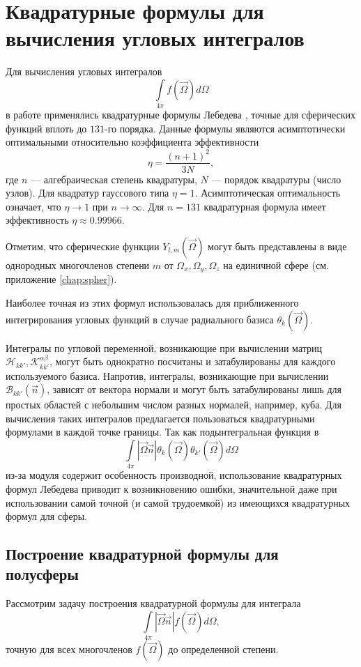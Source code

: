 \section{Квадратурные формулы для вычисления угловых интегралов}

Для вычисления угловых интегралов
\[
\int\limits_{4\pi} f(\vec \Omega) d\Omega 
\]
в работе применялись квадратурные формулы Лебедева \cite{lebedev1999}, точные для сферических функций вплоть до $131$-го порядка. Данные формулы являются асимптотически оптимальными относительно коэффициента эффективности
\[
\eta = \frac{(n+1)^2}{3N},
\]
где $n$ --- алгебраическая степень квадратуры, $N$ --- порядок квадратуры (число узлов). Для квадратур гауссового типа $\eta = 1$. Асимптотическая оптимальность означает, что $\eta \to 1$ при $n \to \infty$. Для $n = 131$ квадратурная формула имеет эффективность $\eta \approx 0.99966$.

Отметим, что сферические функции $Y_{l,m}(\vec \Omega)$ могут быть представлены в виде однородных многочленов степени $m$ от $\Omega_x, \Omega_y, \Omega_z$ на единичной сфере (см. приложение \ref{chap:spher}).

Наиболее точная из этих формул использовалась для приближенного интегрирования угловых функций в случае радиального базиса $\theta_k(\vec \Omega)$.

Интегралы по угловой переменной, возникающие при вычислении матриц $\mathscr H_{kk'}, \mathscr K_{kk'}^{\alpha\beta}$, могут быть однократно посчитаны и затабулированы для каждого используемого базиса. Напротив, интегралы, возникающие при вычислении $\mathscr{B}_{kk'}(\vec n)$, зависят от вектора нормали и могут быть затабулированы лишь для простых областей с небольшим числом разных нормалей, например, куба. Для вычисления таких интегралов предлагается пользоваться квадратурными формулами в каждой точке границы. Так как подынтегральная функция в 
\[
\int\limits_{4\pi} |\vec \Omega \vec n| \theta_k(\vec \Omega) \theta_{k'}(\vec \Omega) d\Omega
\]
из-за модуля содержит особенность производной, использование квадратурных формул Лебедева приводит к возникновению ошибки, значительной даже при использовании самой точной (и самой трудоемкой) из имеющихся квадратурных формул для сферы.

\subsection{Построение квадратурной формулы для полусферы}

Рассмотрим задачу построения квадратурной формулы для интеграла
\begin{equation}
\int\limits_{4\pi} |\vec \Omega \vec n| f(\vec \Omega) d\Omega,
\label{eq:abs}
\end{equation}
точную для всех многочленов $f(\vec \Omega)$ до определенной степени.

